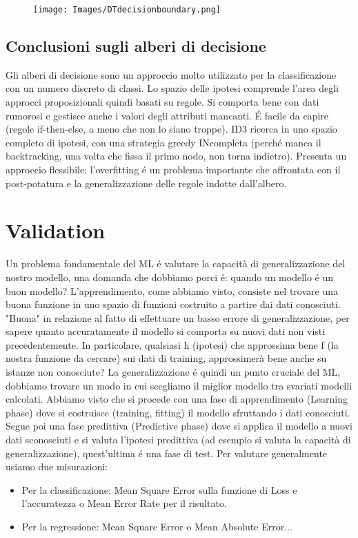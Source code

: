 \documentclass{article}
\begin{document}
\begin{figure}[H]
\centering
\texttt{[image: Images/DTdecisionboundary.png]}
\end{figure}

\subsection{Conclusioni sugli alberi di decisione}
Gli alberi di decisione sono un approccio molto utilizzato per la classificazione con un numero discreto di classi. Lo spazio delle ipotesi comprende l'area degli approcci proposizionali quindi basati su regole. Si comporta bene con dati rumorosi e gestisce anche i valori degli attributi mancanti. É facile da capire (regole if-then-else, a meno che non lo siano troppe). ID3 ricerca in uno spazio completo di ipotesi, con una strategia greedy INcompleta (perché manca il backtracking, una volta che fissa il primo nodo, non torna indietro). Presenta un approccio flessibile: l'overfitting é un problema importante che affrontata con il post-potatura e la generalizzazione delle regole indotte dall'albero.

\section{Validation}
Un problema fondamentale del ML é valutare la capacità di generalizzazione del nostro modello, una domanda che dobbiamo porci é: quando un modello é un buon modello? L'apprendimento, come abbiamo visto, consiste nel trovare una buona funzione in uno spazio di funzioni costruito a partire dai dati conosciuti. "Buona" in relazione al fatto di effettuare un basso errore di generalizzazione, per sapere quanto accuratamente il modello si comporta su nuovi dati non visti precedentemente. \newline 
In particolare, qualsiasi h (ipotesi) che approssima bene f (la nostra funzione da cercare) sui dati di training, approssimerà bene anche su istanze non conosciute? La generalizzazione é quindi un punto cruciale del ML, dobbiamo trovare un modo in cui scegliamo il miglior modello tra svariati modelli calcolati.
Abbiamo visto che si procede con una fase di apprendimento (Learning phase) dove si costruisce (training, fitting) il modello sfruttando i dati conosciuti. Segue poi una fase predittiva (Predictive phase) dove si applica il modello a nuovi dati sconosciuti e si valuta l'ipotesi predittiva (ad esempio si valuta la capacità di generalizzazione), quest'ultima é una fase di test. \newline
Per valutare generalmente usiamo due misurazioni:
\begin{itemize}
    \item Per la classificazione: Mean Square Error sulla funzione di Loss e l'accuratezza o Mean Error Rate per il risultato.
    \item Per la regressione: Mean Square Error o Mean Absolute Error...
\end{itemize}
\end{document}
